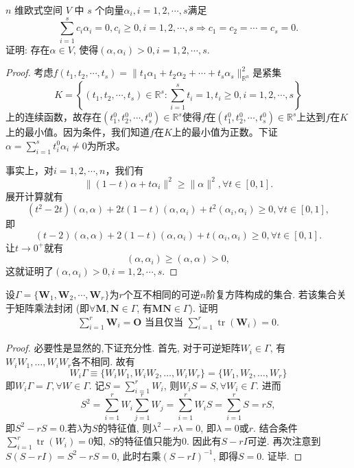 \documentclass[../../main.tex]{subfiles}
\begin{document}
\begin{example}
\( n \) 维欧式空间 \( V \) 中 \( s \) 个向量\(\alpha_i, i = 1,2,\cdots,s\)满足
\[
\sum_{i=1}^{s} c_i \alpha_i = 0, c_i \geqslant 0, i = 1,2,\cdots,s \Rightarrow c_1 = c_2 = \cdots = c_s = 0.
\]
证明: 存在\(\alpha \in V\), 使得\((\alpha, \alpha_i) > 0, i = 1,2,\cdots,s\).
\end{example}
\begin{proof}
考虑\( f(t_1, t_2, \cdots, t_s) = \| t_1 \alpha_1 + t_2 \alpha_2 + \cdots + t_s \alpha_s \|_{\mathbb{R}^n}^2 \)是紧集
\[
K = \left\{ (t_1, t_2, \cdots, t_s) \in \mathbb{R}^s: \sum_{i=1}^s t_i = 1, t_i \geqslant 0, i = 1, 2, \cdots, s \right\}
\]
上的连续函数，故存在\( (t_1^0, t_2^0, \cdots, t_s^0) \in \mathbb{R}^s \)使得\( f \)在\( (t_1^0, t_2^0, \cdots, t_s^0) \in \mathbb{R}^s \)上达到\( f \)在\( K \)上的最小值。因为条件，我们知道\( f \)在\( K \)上的最小值为正数。下证\( \alpha = \sum_{i=1}^s t_i^0 \alpha_i \neq 0 \)为所求。

事实上，对\( i = 1, 2, \cdots, n \)，我们有
\[
\| (1 - t) \alpha + t \alpha_i \|^2 \geqslant \| \alpha \|^2, \forall t \in [0, 1].
\]
展开计算就有
\[
(t^2 - 2t) (\alpha, \alpha) + 2t (1 - t) (\alpha, \alpha_i) + t^2 (\alpha_i, \alpha_i) \geqslant 0, \forall t \in [0, 1],
\]
即
\[
(t - 2) (\alpha, \alpha) + 2 (1 - t) (\alpha, \alpha_i) + t (\alpha_i, \alpha_i) \geqslant 0, \forall t \in [0, 1].
\]
让\( t \to 0^+ \)就有
\[
(\alpha, \alpha_i) \geqslant (\alpha, \alpha) > 0,
\]
这就证明了\( (\alpha, \alpha_i) > 0, i = 1, 2, \cdots, s \).

\end{proof}

\begin{example}
设\(\varGamma = \{\boldsymbol{W}_1, \boldsymbol{W}_2, \cdots, \boldsymbol{W}_r\}\)为\(r\)个互不相同的可逆\(n\)阶复方阵构成的集合. 若该集合关于矩阵乘法封闭 (即\(\forall \boldsymbol{M}, \boldsymbol{N} \in \varGamma\), 有\(\boldsymbol{MN} \in \varGamma\)). 证明
\begin{align*}
\sum_{i=1}^r \boldsymbol{W}_i = \boldsymbol{O} \text{ 当且仅当 } \sum_{i=1}^r \operatorname{tr}\left( \boldsymbol{W}_i \right) = 0.
\end{align*}
\end{example}
\begin{proof}
必要性是显然的,下证充分性.
首先, 对于可逆矩阵\( W_i \in \varGamma \), 有\( W_iW_1, \dots, W_iW_r \)各不相同. 故有
\[
W_i\varGamma \equiv \{ W_iW_1, W_iW_2, \dots, W_iW_r \} = \{ W_1, W_2, \dots, W_r \}
\]
即\( W_i\varGamma = \varGamma, \forall W \in \varGamma \).
记\( S = \sum_{i=1}^r W_i \), 则\( W_iS = S, \forall W_i \in \varGamma \). 进而
\[
S^2=\sum_{i=1}^r{W_i\sum_{j=1}^r{W_j}}=\sum_{i=1}^r{W_iS}=\sum_{i=1}^r{S}=rS,
\]
即$S^2-rS=0$.若\( \lambda \)为\( S \)的特征值, 则\( \lambda^2 - r\lambda = 0 \), 即\( \lambda = 0 \)或\( r \).
结合条件\( \sum_{i=1}^r \operatorname{tr}\left( W_i \right) = 0 \)知, \( S \)的特征值只能为\( 0 \). 因此有\( S - rI \)可逆.
再次注意到\( S(S - rI) = S^2 - rS = 0 \), 此时右乘\( (S - rI)^{-1} \), 即得\( S = 0 \). 证毕.

\end{proof}
\end{document}
